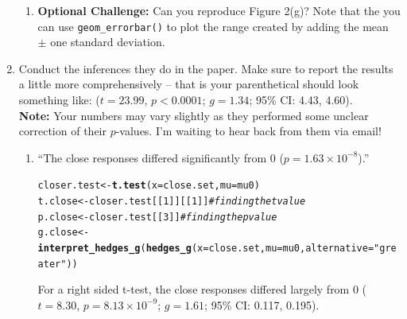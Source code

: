 \documentclass{article}\usepackage[]{graphicx}\usepackage[]{xcolor}
\makeatletter
\newcommand{\hlnum}[1]{\textcolor[rgb]{0.686,0.059,0.569}{#1}}%
\newcommand{\hlsng}[1]{\textcolor[rgb]{0.192,0.494,0.8}{#1}}%
\newcommand{\hlcom}[1]{\textcolor[rgb]{0.678,0.584,0.686}{\textit{#1}}}%
\newcommand{\hldef}[1]{\textcolor[rgb]{0.345,0.345,0.345}{#1}}%
\newcommand{\hlkwb}[1]{\textcolor[rgb]{0.69,0.353,0.396}{#1}}%
\newcommand{\hlkwc}[1]{\textcolor[rgb]{0.333,0.667,0.333}{#1}}%
\newcommand{\hlkwd}[1]{\textcolor[rgb]{0.737,0.353,0.396}{\textbf{#1}}}%
\newenvironment{kframe}{%
 \def\at@end@of@kframe{}%
 \ifinner\ifhmode%
  \def\at@end@of@kframe{\end{minipage}}%
  \begin{minipage}{\columnwidth}%
 \fi\fi%
 \def\FrameCommand##1{\hskip\@totalleftmargin \hskip-\fboxsep
 \colorbox{shadecolor}{##1}\hskip-\fboxsep
     \hskip-\linewidth \hskip-\@totalleftmargin \hskip\columnwidth}%
 \MakeFramed {\advance\hsize-\width
   \@totalleftmargin\z@ \linewidth\hsize
   \@setminipage}}%
 {\par\unskip\endMakeFramed%
 \at@end@of@kframe}
\newenvironment{knitrout}{}{} %
\makeatother
\begin{document}
\begin{enumerate}
\begin{enumerate}
  \item \textbf{Optional Challenge:} Can you reproduce Figure 2(g)?
  Note that the you can use \texttt{geom\_errorbar()} to plot
  the range created by adding the mean $\pm$ one standard deviation.
\end{enumerate}
\item Conduct the inferences they do in the paper. Make sure to report the results
a little more comprehensively -- that is your parenthetical should look something
like: ($t=23.99$, $p<0.0001$; $g=1.34$; 95\% CI: 4.43, 4.60).\\
\textbf{Note:} Your numbers may vary slightly as they performed some unclear
correction of their $p$-values. I'm waiting to hear back from them via email!


\begin{enumerate}
  \item ``The close responses differed significantly from 0 ($p=1.63 \times 10^{-8}$).''
\begin{knitrout}\scriptsize
{}\color{fgcolor}\begin{kframe}
\begin{alltt}
\hldef{closer.test} \hlkwb{<-} \hlkwd{t.test}\hldef{(}\hlkwc{x}\hldef{=close.set,} \hlkwc{mu} \hldef{= mu0)}
\hldef{t.close} \hlkwb{<-} \hldef{closer.test[[}\hlnum{1}\hldef{]][[}\hlnum{1}\hldef{]]} \hlcom{#finding the t value }
\hldef{p.close} \hlkwb{<-} \hldef{closer.test[[}\hlnum{3}\hldef{]]} \hlcom{#finding the p value}
\hldef{g.close} \hlkwb{<-} \hlkwd{interpret_hedges_g}\hldef{(}\hlkwd{hedges_g}\hldef{(}\hlkwc{x} \hldef{= close.set,} \hlkwc{mu} \hldef{= mu0,} \hlkwc{alternative} \hldef{=} \hlsng{"greater"}\hldef{))}
\end{alltt}
\end{kframe}
\end{knitrout}
For a right sided t-test, the close responses differed largely from 0 ($t=8.30$, $p=8.13 \times 10^{-9}$; $g=1.61$; 95\% CI: 0.117, 0.195). 


\end{enumerate}
\end{enumerate}
\end{document}
